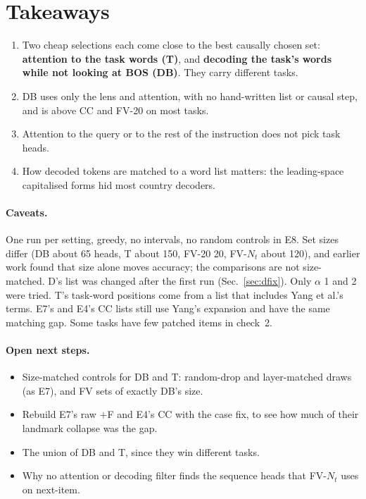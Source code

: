 \documentclass[10pt,a4paper]{article}
\begin{document}
\section{Takeaways}

\begin{enumerate}
\item Two cheap selections each come close to the best causally chosen set: \textbf{attention to the task words (T)}, and \textbf{decoding the task's words while not looking at BOS (DB)}. They carry different tasks.
\item DB uses only the lens and attention, with no hand-written list or causal step, and is above CC and FV-20 on most tasks.
\item Attention to the query or to the rest of the instruction does not pick task heads.
\item How decoded tokens are matched to a word list matters: the leading-space capitalised forms hid most country decoders.
\end{enumerate}

\paragraph{Caveats.} One run per setting, greedy, no intervals, no random controls in E8. Set sizes differ (DB about 65 heads, T about 150, FV-20 20, FV-$N_t$ about 120), and earlier work found that size alone moves accuracy; the comparisons are not size-matched. D's list was changed after the first run (Sec.~\ref{sec:dfix}). Only $\alpha$ 1 and 2 were tried. T's task-word positions come from a list that includes Yang et al.'s terms. E7's and E4's CC lists still use Yang's expansion and have the same matching gap. Some tasks have few patched items in check~2.

\paragraph{Open next steps.}
\begin{itemize}
\item Size-matched controls for DB and T: random-drop and layer-matched draws (as E7), and FV sets of exactly DB's size.
\item Rebuild E7's raw $+$F and E4's CC with the case fix, to see how much of their landmark collapse was the gap.
\item The union of DB and T, since they win different tasks.
\item Why no attention or decoding filter finds the sequence heads that FV-$N_t$ uses on next-item.
\end{itemize}
\end{document}

